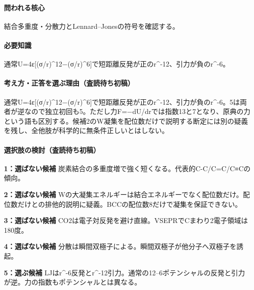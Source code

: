 \paragraph{問われる核心} 結合多重度・分散力とLennard–Jonesの符号を確認する。

\paragraph{必要知識} 通常U=\allowbreak{}4ε[(σ/r)\textasciicircum{}12−(σ/r)\textasciicircum{}6]で短距離反発が正のr\textasciicircum{}-12、引力が負のr\textasciicircum{}-6。

\paragraph{考え方・正答を選ぶ理由（査読待ち初稿）} 通常U=\allowbreak{}4ε[(σ/r)\textasciicircum{}12−(σ/r)\textasciicircum{}6]で短距離反発が正のr\textasciicircum{}-12、引力が負のr\textasciicircum{}-6。5は両者が逆なので独立初回も5。ただし力F=−dU/drでは指数13と7となり、原典の力という語も区別する。候補2のW凝集を配位数だけで説明する断定には別の疑義を残し、全他肢が科学的に無条件正しいとはしない。

\paragraph{選択肢の検討（査読待ち初稿）}\mbox{}\par

\noindent\textbf{1：選ばない候補} 炭素結合の多重度増で強く短くなる。代表的C-C/C=\allowbreak{}C/C≡Cの傾向。\par

\noindent\textbf{2：選ばない候補} Wの大凝集エネルギーは結合エネルギーでなく配位数だけ。配位数だけとの排他的説明に疑義。BCCの配位数8だけで凝集を保証できない。\par

\noindent\textbf{3：選ばない候補} CO2は電子対反発を避け直線。VSEPRでCまわり2電子領域は180度。\par

\noindent\textbf{4：選ばない候補} 分散は瞬間双極子による。瞬間双極子が他分子へ双極子を誘起。\par

\noindent\textbf{5：選ぶ候補} LJはr\textasciicircum{}-6反発とr\textasciicircum{}-12引力。通常の12–6ポテンシャルの反発と引力が逆。力の指数もポテンシャルとは異なる。\par

